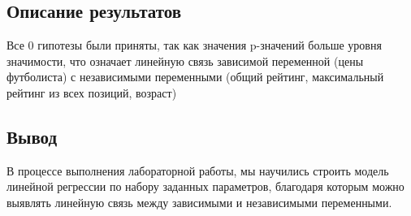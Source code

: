 \documentclass{article}
\begin{document}
\subsection{Описание результатов}\label{subsec:-3}
Все 0 гипотезы были приняты, так как значения p-значений больше уровня значимости, что означает линейную связь
зависимой переменной (цены футболиста) с независимыми переменными (общий рейтинг, максимальный рейтинг из всех
позиций, возраст)

\subsection{Вывод}\label{subsec:}

В процессе выполнения лабораторной работы, мы научились строить модель линейной регрессии по набору заданных параметров,
благодаря которым можно выявлять линейную связь между зависимыми и независимыми переменными.
\end{document}
